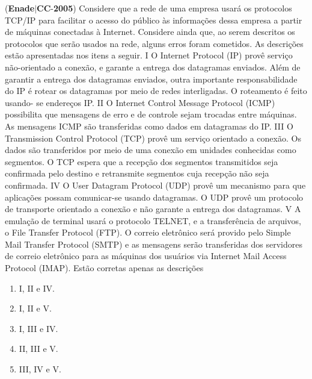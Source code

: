\documentclass{exam}
\begin{document}
\begin{questions}
\begin{enumerate}[label=\alph*)]
	\end{enumerate}

\question (\textbf{Enade}$|$\textbf{CC}-\textbf{2005}) Considere que a rede de uma empresa usará os protocolos
TCP/IP para facilitar o acesso do público às informações dessa
empresa a partir de máquinas conectadas à Internet. Considere
ainda que, ao serem descritos os protocolos que serão usados na
rede, alguns erros foram cometidos. As descrições estão
apresentadas nos itens a seguir.
I O Internet Protocol (IP) provê serviço não-orientado a
conexão, e garante a entrega dos datagramas enviados. Além
de garantir a entrega dos datagramas enviados, outra
importante responsabilidade do IP é rotear os datagramas
por meio de redes interligadas. O roteamento é feito usando-
se endereços IP.
II O Internet Control Message Protocol (ICMP) possibilita
que mensagens de erro e de controle sejam trocadas entre
máquinas. As mensagens ICMP são transferidas como dados
em datagramas do IP.
III O Transmission Control Protocol (TCP) provê um serviço
orientado a conexão. Os dados são transferidos por meio de
uma conexão em unidades conhecidas como segmentos.
O TCP espera que a recepção dos segmentos transmitidos
seja confirmada pelo destino e retransmite segmentos cuja
recepção não seja confirmada.
IV O User Datagram Protocol (UDP) provê um mecanismo
para que aplicações possam comunicar-se usando
datagramas. O UDP provê um protocolo de transporte
orientado a conexão e não garante a entrega dos datagramas.
V A emulação de terminal usará o protocolo TELNET, e a
transferência de arquivos, o File Transfer Protocol (FTP).
O correio eletrônico será provido pelo Simple Mail Transfer
Protocol (SMTP) e as mensagens serão transferidas dos
servidores de correio eletrônico para as máquinas dos
usuários via Internet Mail Access Protocol (IMAP).
Estão corretas apenas as descrições
	\begin{enumerate}[label=\alph*)]
		\item  I, II e IV. 
		\item  I, II e V. 
		\item  I, III e IV.
		\item  II, III e V.
		\item  III, IV e V.

	\end{enumerate}


\end{questions}
\end{document}
